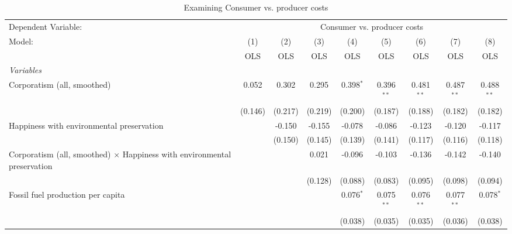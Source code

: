 
\begin{table}[htbp]
   \caption{Examining Consumer vs. producer costs}
   \centering
   \begin{tabular}{lcccccccc}
      \toprule
      Dependent Variable: & \multicolumn{8}{c}{Consumer vs. producer costs}\\
      Model:                                                                          & (1)     & (2)     & (3)     & (4)         & (5)          & (6)          & (7)          & (8)\\  
                                                                                      &  OLS    & OLS     & OLS     & OLS         & OLS          & OLS          & OLS          & OLS\\  
      \midrule
      \emph{Variables}\\
      Corporatism (all, smoothed)                                                     & 0.052   & 0.302   & 0.295   & 0.398$^{*}$ & 0.396$^{**}$ & 0.481$^{**}$ & 0.487$^{**}$ & 0.488$^{**}$\\   
                                                                                      & (0.146) & (0.217) & (0.219) & (0.200)     & (0.187)      & (0.188)      & (0.182)      & (0.182)\\   
      Happiness with environmental preservation                                       &         & -0.150  & -0.155  & -0.078      & -0.086       & -0.123       & -0.120       & -0.117\\   
                                                                                      &         & (0.150) & (0.145) & (0.139)     & (0.141)      & (0.117)      & (0.116)      & (0.118)\\   
      Corporatism (all, smoothed) $\times$ Happiness with environmental preservation  &         &         & 0.021   & -0.096      & -0.103       & -0.136       & -0.142       & -0.140\\   
                                                                                      &         &         & (0.128) & (0.088)     & (0.083)      & (0.095)      & (0.098)      & (0.094)\\   
      Fossil fuel production per capita                                               &         &         &         & 0.076$^{*}$ & 0.075$^{**}$ & 0.076$^{**}$ & 0.077$^{**}$ & 0.078$^{*}$\\   
                                                                                      &         &         &         & (0.038)     & (0.035)      & (0.035)      & (0.036)      & (0.038)\\   

\end{tabular}
\end{table}
